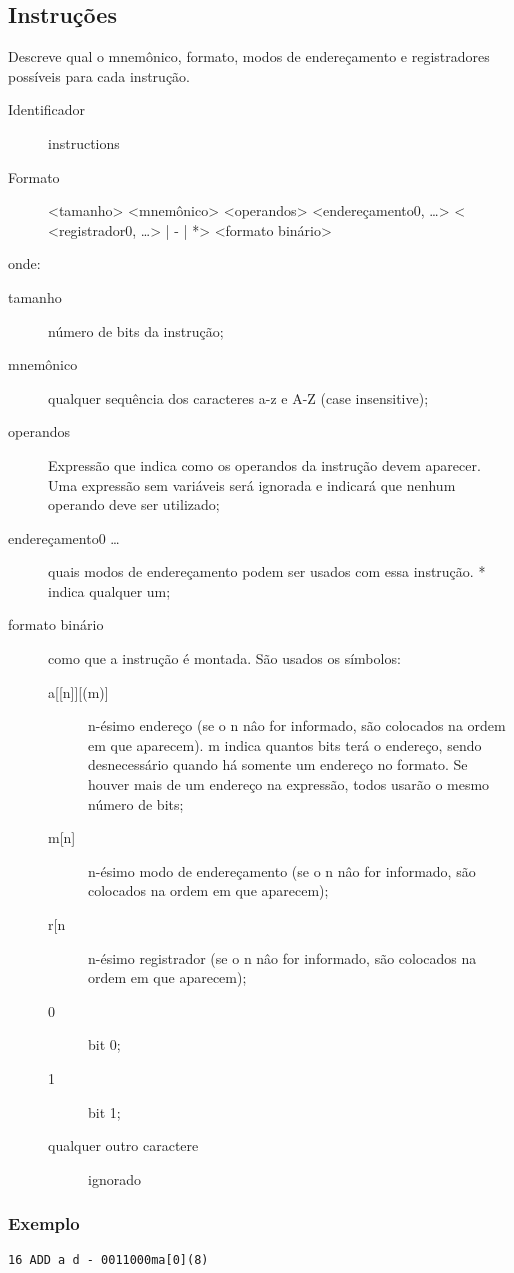 \documentclass[a4paper,10pt]{article}
\begin{document}
		\subsection{Instruções}
		\label{instruções}
		Descreve qual o mnemônico, formato, modos de endereçamento e registradores possíveis para cada instrução.
		
		\begin{description}
		 \item [Identificador] instructions
		 \item [Formato] <tamanho> <mnemônico> <operandos> <endereçamento0, \dots> < <registrador0, \dots> | - | *> <formato binário>
		\end{description}
		onde:
		\begin{description}
		 \item [tamanho] número de bits da instrução;
		 \item [mnemônico] qualquer sequência dos caracteres a-z e A-Z (case insensitive);
		 \item [operandos] Expressão que indica como os operandos da instrução devem aparecer. Uma expressão sem variáveis será ignorada e indicará que nenhum operando deve ser utilizado;
		 \item [endereçamento0 \dots] quais modos de endereçamento podem ser usados com essa instrução. * indica qualquer um;
		 \item [formato binário] como que a instrução é montada. São usados os símbolos:
			\begin{description}
			 \item [a{[[n]][(m)]}] n-ésimo endereço (se o n nâo for informado, são colocados na ordem em que aparecem). m indica quantos bits terá o endereço, sendo desnecessário quando há somente um endereço no formato. Se houver mais de um endereço na expressão, todos usarão o mesmo número de bits;
			 \item [m{[n]}] n-ésimo modo de endereçamento (se o n nâo for informado, são colocados na ordem em que aparecem);
			 \item [r{[n}]  n-ésimo registrador (se o n nâo for informado, são colocados na ordem em que aparecem);
			 \item [0] bit 0;
			 \item [1] bit 1;
			 \item [qualquer outro caractere] ignorado
			\end{description}
		\end{description}
		
		\subsubsection{Exemplo}
			\verb+16 ADD a d - 0011000ma[0](8)+
\end{document}
